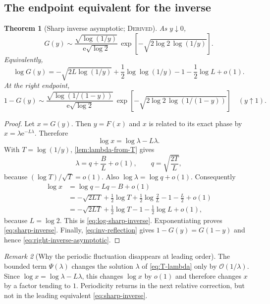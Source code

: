 \documentclass[11pt,oneside]{article}
\newtheorem{theorem}{Theorem}[section]
\theoremstyle{definition}
\theoremstyle{remark}
\newtheorem{remark}[theorem]{Remark}
\newcommand{\e}{\mathrm e}
\newcommand{\bigO}{\mathcal O}
\newcommand{\InvF}{G}
\newcommand{\Derived}{\textsc{Derived}}
\begin{document}
\subsection{The endpoint equivalent for the inverse}

\begin{theorem}[Sharp inverse asymptotic; \Derived]
\label{thm:sharp-inverse-asymptotic}
As $y\downarrow0$,
\begin{equation}
 \boxed{\;
 \InvF(y)\sim
 \frac{\sqrt{\log(1/y)}}{\e\sqrt{\log2}}\,
 \exp\!\left[-\sqrt{2\log2\,\log(1/y)}\right].
 \;} \label{eq:sharp-inverse}
\end{equation}
Equivalently,
\begin{equation}
 \log\InvF(y)
 =-\sqrt{2L\log(1/y)}
  +\frac12\log\log(1/y)
  -1-\frac12\log L+o(1). \label{eq:log-sharp-inverse}
\end{equation}
At the right endpoint,
\begin{equation}
 1-\InvF(y)\sim
 \frac{\sqrt{\log(1/(1-y))}}{\e\sqrt{\log2}}\,
 \exp\!\left[-\sqrt{2\log2\,\log(1/(1-y))}\right]
 \quad(y\uparrow1). \label{eq:right-inverse-asymptotic}
\end{equation}
\end{theorem}

\begin{proof}
Let $x=\InvF(y)$.  Then $y=F(x)$ and $x$ is related to its exact phase by
$x=\lambda\e^{-L\lambda}$.  Therefore
\[
 \log x=\log\lambda-L\lambda.
\]
With $T=\log(1/y)$, \cref{lem:lambda-from-T} gives
\[
 \lambda=q+\frac BL+o(1),\qquad
 q=\sqrt{\frac{2T}{L}},
\]
because $(\log T)/\sqrt T=o(1)$.  Also $\log\lambda=\log q+o(1)$.
Consequently
\begin{align*}
 \log x
 &=\log q-Lq-B+o(1)\\
 &=-\sqrt{2LT}
   +\frac12\log T+\frac12\log\frac2L
   -1-\frac L2+o(1)\\
 &=-\sqrt{2LT}
   +\frac12\log T-1-\frac12\log L+o(1),
\end{align*}
because $L=\log2$.  This is \eqref{eq:log-sharp-inverse}.
Exponentiating proves \eqref{eq:sharp-inverse}.  Finally,
\eqref{eq:inv-reflection} gives
$1-\InvF(y)=\InvF(1-y)$ and hence
\eqref{eq:right-inverse-asymptotic}.
\end{proof}

\begin{remark}[Why the periodic fluctuation disappears at leading order]
The bounded term $\Psi(\lambda)$ changes the solution $\lambda$ of
\eqref{eq:T-lambda} only by $\bigO(1/\lambda)$.  Since
$\log x=\log\lambda-L\lambda$, this changes $\log x$ by $o(1)$ and
therefore changes $x$ by a factor tending to $1$.  Periodicity returns in
the next relative correction, but not in the leading equivalent
\eqref{eq:sharp-inverse}.
\end{remark}
\end{document}
